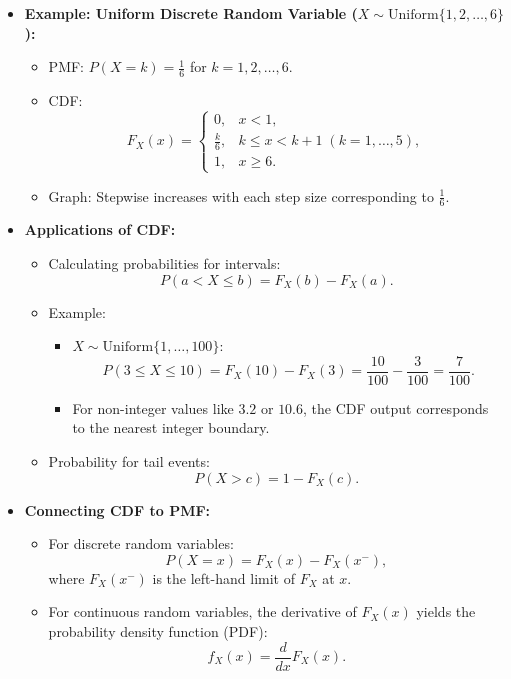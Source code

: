 \documentclass{article}
\begin{document}
\begin{itemize}
  \item \textbf{Example: Uniform Discrete Random Variable ($X \sim \text{Uniform}\{1, 2, \dots, 6\}$):}
    \begin{itemize}
      \item PMF: $P(X = k) = \frac{1}{6}$ for $k = 1, 2, \dots, 6$.
      \item CDF:
        \[
          F_X(x) =
          \begin{cases}
            0, & x < 1, \\
            \frac{k}{6}, & k \leq x < k+1 \; (k = 1, \dots, 5), \\
            1, & x \geq 6.
          \end{cases}
        \]
      \item Graph: Stepwise increases with each step size corresponding to $\frac{1}{6}$.
    \end{itemize}

  \item \textbf{Applications of CDF:}
    \begin{itemize}
      \item Calculating probabilities for intervals:
        \[
          P(a < X \leq b) = F_X(b) - F_X(a).
        \]
      \item Example:
        \begin{itemize}
          \item $X \sim \text{Uniform}\{1, \dots, 100\}$:
            \[
              P(3 \leq X \leq 10) = F_X(10) - F_X(3) = \frac{10}{100} - \frac{3}{100} = \frac{7}{100}.
            \]
          \item For non-integer values like $3.2$ or $10.6$, the CDF output corresponds to the nearest integer boundary.
        \end{itemize}
      \item Probability for tail events:
        \[
          P(X > c) = 1 - F_X(c).
        \]
    \end{itemize}

  \item \textbf{Connecting CDF to PMF:}
    \begin{itemize}
      \item For discrete random variables:
        \[
          P(X = x) = F_X(x) - F_X(x^-),
        \]
        where $F_X(x^-)$ is the left-hand limit of $F_X$ at $x$.
      \item For continuous random variables, the derivative of $F_X(x)$ yields the probability density function (PDF):
        \[
          f_X(x) = \frac{d}{dx}F_X(x).
        \]
    \end{itemize}
\end{itemize}
\end{document}

